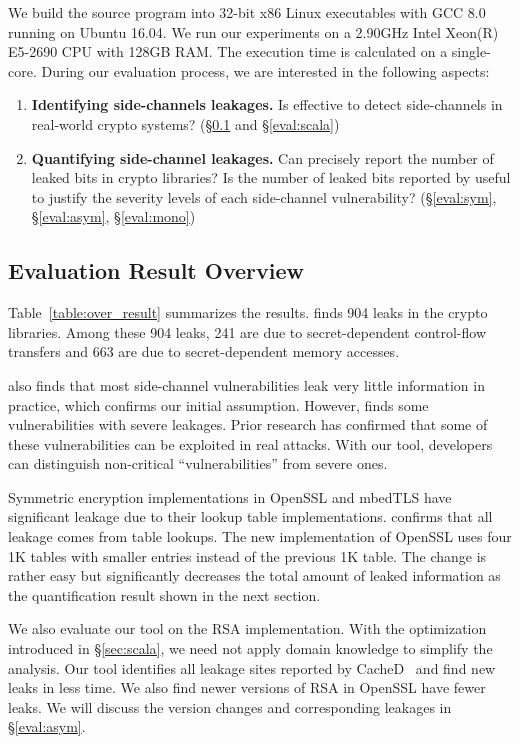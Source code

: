 We build the source program into 32-bit x86 Linux executables with GCC 8.0
running on Ubuntu 16.04. 
We run our experiments on a 2.90GHz Intel Xeon(R) E5-2690 CPU with 128GB
RAM. The execution time is calculated on a single-core.
During our evaluation process, we are interested in the following
aspects:
\begin{enumerate}
    \item  \textbf{Identifying side-channels leakages.}
          Is \tool{} effective to detect side-channels in real-world crypto
          systems? (\S\ref{sec:eval_overview} and \S\ref{eval:scala})
    \item  \textbf{Quantifying side-channel leakages.}
          Can \tool{} precisely report the number of leaked bits in crypto
          libraries? Is the number of leaked bits reported by \tool{} useful
          to justify the severity levels of each side-channel vulnerability?
          (\S\ref{eval:sym}, \S\ref{eval:asym}, \S\ref{eval:mono})
\end{enumerate}

\subsection{Evaluation Result Overview} \label{sec:eval_overview}
Table~\ref{table:over_result} summarizes the results. 
\tool{} finds 904 leaks in the crypto libraries. 
Among these 904 leaks, 241 are due to secret-dependent 
control-flow transfers and 663 are due to secret-dependent memory accesses.

\tool{} also finds that most side-channel
vulnerabilities leak very little information in practice, which confirms our
initial assumption.  
However, \tool{} finds some vulnerabilities with severe
leakages. Prior research has confirmed that some of these
vulnerabilities can be exploited in real attacks.
With our tool, developers can
distinguish non-critical ``vulnerabilities'' from severe ones.

Symmetric encryption implementations in OpenSSL and mbedTLS have significant
leakage due to their lookup table implementations. 
\tool{} confirms that all leakage comes from table
lookups. The new
implementation of OpenSSL uses four 1K
 tables with smaller entries instead of the previous 1K table.  The change is rather easy but significantly decreases the total
amount of leaked information as the quantification result shown in the next
section.

We also evaluate our tool on the RSA implementation. With the optimization
introduced in \S\ref{sec:scala}, we need not apply domain knowledge to
simplify the analysis. Our tool identifies all leakage sites
reported by CacheD~\cite{203878} and find new leaks in less time. 
We also find newer
versions of RSA in OpenSSL have fewer leaks. We
will discuss the version changes and corresponding leakages in \S\ref{eval:asym}.

